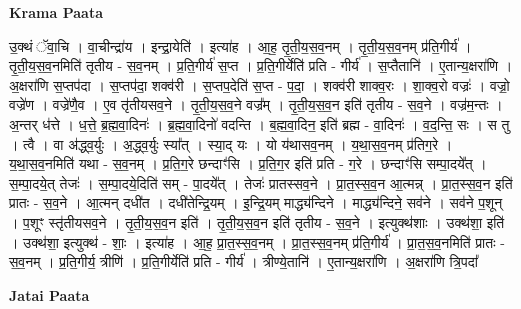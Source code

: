\documentclass[17pt]{extarticle}
\begin{document}
\textbf{Krama Paata} \newline

उ॒क्थं ॅवा॒चि । वा॒चीन्द्रा॑य । इन्द्रा॒येति॑ । इत्या॑ह । आ॒ह॒ तृ॒ती॒य॒स॒व॒नम् । तृ॒ती॒य॒स॒व॒नम् प्र॑ति॒गीर्य॑ । तृ॒ती॒य॒स॒व॒नमिति॑ तृतीय - स॒व॒नम् । प्र॒ति॒गीर्य॑ स॒प्त । प्र॒ति॒गीर्येति॑ प्रति - गीर्य॑ । स॒प्तैतानि॑ । ए॒तान्य॒क्षरा॑णि । अ॒क्षरा॑णि स॒प्तप॑दा । स॒प्तप॑दा॒ शक्व॑री । स॒प्तप॒देति॑ स॒प्त - प॒दा॒ । शक्व॑री शाक्व॒रः । शा॒क्व॒रो वज्रः॑ । वज्रो॒ वज्रे॑ण । वज्रे॑णै॒व । ए॒व तृ॑तीयसव॒ने । तृ॒ती॒य॒स॒व॒ने वज्र᳚म् । तृ॒ती॒य॒स॒व॒न इति॑ तृतीय - स॒व॒ने । वज्र॑म॒न्तः । अ॒न्तर् ध॑त्ते । ध॒त्ते॒ ब्र॒ह्म॒वा॒दिनः॑ । ब्र॒ह्म॒वा॒दिनो॑ वदन्ति । ब॒ह्म॒वा॒दिन॒ इति॑ ब्रह्म - वा॒दिनः॑ । व॒द॒न्ति॒ सः । स तु । त्वै । वा अ॑द्ध्व॒र्युः । अ॒द्ध्व॒र्युः स्या᳚त् । स्या॒द् यः । यो य॑थासव॒नम् । य॒था॒स॒व॒नम् प्र॑तिग॒रे । य॒था॒स॒व॒नमिति॑ यथा - स॒व॒नम् । प्र॒ति॒ग॒रे छन्दाꣳ॑सि । प्र॒ति॒ग॒र इति॑ प्रति - ग॒रे । छन्दाꣳ॑सि सम्पा॒दये᳚त् । स॒म्पा॒दये॒त् तेजः॑ । स॒म्पा॒दये॒दिति॑ सम् - पा॒दये᳚त् । तेजः॑ प्रातस्सव॒ने । प्रा॒त॒स्स॒व॒न आ॒त्मन्न् । प्रा॒त॒स्स॒व॒न इति॑ प्रातः - स॒व॒ने । आ॒त्मन् दधी॑त । दधी॑तेन्द्रि॒यम् । इ॒न्द्रि॒यम् माद्ध्य॑न्दिने । माद्ध्य॑न्दिने॒ सव॑ने । सव॑ने प॒शून् । प॒शूꣳ स्तृ॑तीयसव॒ने । तृ॒ती॒य॒स॒व॒न इति॑ । तृ॒ती॒य॒स॒व॒न इति॑ तृतीय - स॒व॒ने । इत्युक्थ॑शाः । उक्थ॑शा॒ इति॑ । उक्थ॑शा॒ इत्युक्थ॑ - शाः॒ । इत्या॑ह । आ॒ह॒ प्रा॒त॒स्स॒व॒नम् । प्रा॒त॒स्स॒व॒नम् प्र॑ति॒गीर्य॑ । प्रा॒त॒स॒व॒नमिति॑ प्रातः - स॒व॒नम् । प्र॒ति॒गीर्य॒ त्रीणि॑ । प्र॒ति॒गीर्येति॑ प्रति - गीर्य॑ । त्रीण्ये॒तानि॑ । ए॒तान्य॒क्षरा॑णि । अ॒क्षरा॑णि त्रि॒पदा᳚ \newline

\textbf{Jatai Paata} \newline
\end{document}
